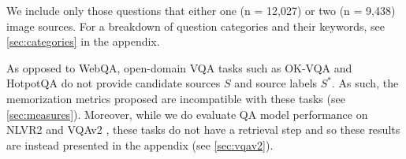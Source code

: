 We include only those questions that either one (n = 12,027) or two (n = 9,438) image sources. For a breakdown of question categories and their keywords, see \autoref{sec:categories} in the appendix.

As opposed to WebQA, open-domain VQA tasks such as OK-VQA \citep{marino_ok-vqa_2019} and HotpotQA \citep{yang2018hotpotqa} do not provide candidate sources $S$ and source labels $S^*$. As such, the memorization metrics proposed are incompatible with these tasks (see \autoref{sec:measures}). Moreover, while we do evaluate QA model performance on NLVR2 \citep{nlvr2} and VQAv2 \citep{goyal2017making}, these tasks do not have a retrieval step and so these results are instead presented in the appendix (see \autoref{sec:vqav2}).




